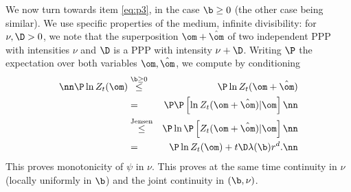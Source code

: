 We now turn towards item \ref{eq:p3}, in the case $\b \geq 0$ (the other case being similar). We use specific properties of the medium, infinite divisibility: 
for $\nu, \D>0$, we note that the superposition 
$\om+\hat \om$ of two independent PPP with intensities $\nu$ and $\D$ is  a PPP with intensity $\nu+\D$. Writing $\P$ the expectation 
over both variables ${\om,\hat \om}$, we compute by conditioning
\begin{eqnarray} \nn
\P \ln Z_t(\om) & \stackrel{\b \geq 0}{\leq} & 
\P \ln Z_t(\om + \hat \om) \\ &=& \P \P\left[ \ln Z_t(\om + \hat \om) \vert \om\right] \nn \\
&\stackrel{\rm Jensen}{\leq} & \P \ln \P\left[ Z_t(\om + \hat \om)  \vert \om\right] \nn \\
&=& \P \ln Z_t (\om) + t \D  \lambda(\b) r^d. \nn
\end{eqnarray}
This proves  monotonicity of $\psi$  in $\nu$. This proves  at the same time  continuity in $\nu$ (locally uniformly in $\b$) and the joint continuity in $(\b, \nu)$.

\medskip


